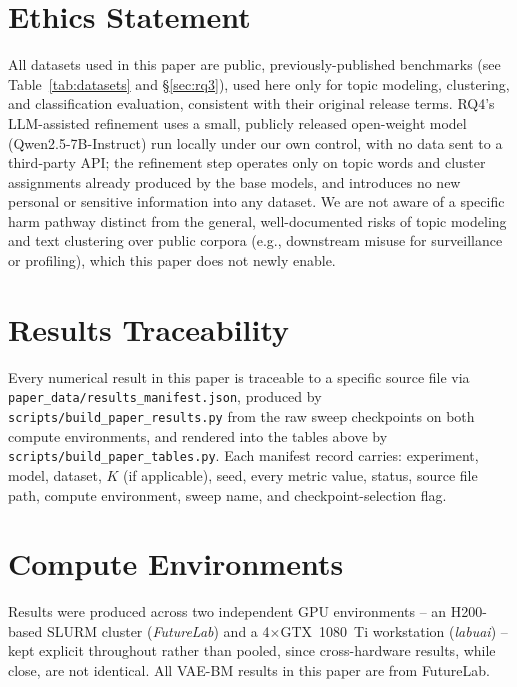 \documentclass[11pt]{article}
\begin{document}
\section*{Ethics Statement}
\label{sec:ethics}
All datasets used in this paper are public, previously-published benchmarks (see Table~\ref{tab:datasets} and \S\ref{sec:rq3}), used here only for topic modeling, clustering, and classification evaluation, consistent with their original release terms. RQ4's LLM-assisted refinement uses a small, publicly released open-weight model (Qwen2.5-7B-Instruct) run locally under our own control, with no data sent to a third-party API; the refinement step operates only on topic words and cluster assignments already produced by the base models, and introduces no new personal or sensitive information into any dataset. We are not aware of a specific harm pathway distinct from the general, well-documented risks of topic modeling and text clustering over public corpora (e.g., downstream misuse for surveillance or profiling), which this paper does not newly enable.




\appendix
\section{Results Traceability}
\label{sec:appendix}
Every numerical result in this paper is traceable to a specific source file via \texttt{paper\_data/\allowbreak results\_manifest.json}, produced by \texttt{scripts/\allowbreak build\_paper\_results.py} from the raw sweep checkpoints on both compute environments, and rendered into the tables above by \texttt{scripts/\allowbreak build\_paper\_tables.py}. Each manifest record carries: experiment, model, dataset, $K$ (if applicable), seed, every metric value, status, source file path, compute environment, sweep name, and checkpoint-selection flag.

\section{Compute Environments}
\label{sec:appendix-compute}
Results were produced across two independent GPU environments -- an H200-based SLURM cluster (\emph{FutureLab}) and a 4$\times$GTX~1080~Ti workstation (\emph{labuai}) -- kept explicit throughout rather than pooled, since cross-hardware results, while close, are not identical. All VAE-BM results in this paper are from FutureLab.
\end{document}
